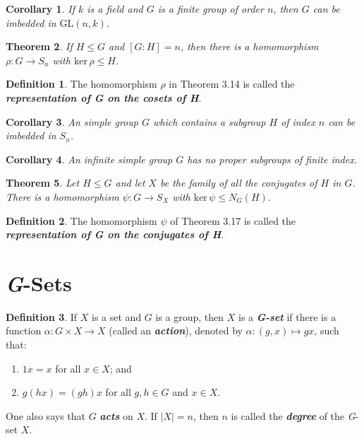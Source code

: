 \documentclass[12pt]{report}
\newtheorem{theorem}{Theorem}[chapter]
\newtheorem{corollary}[theorem]{Corollary}
\theoremstyle{definition}
\newtheorem*{definition}{Definition}
\newcommand{\term}[1]{\textbf{\textit{#1}}}
\begin{document}
\begin{corollary}
	If $k$ is a field and $G$ is a finite group of order $n$, then $G$ can be imbedded in $\mathrm{GL}(n,k)$.
\end{corollary}

\begin{theorem}
	If $H\leq G$ and $[G:H]=n$, then there is a homomorphism $\rho:G\to S_n$ with $\mathrm{ker}\,\rho\leq H$.
\end{theorem}

\begin{definition}
	The homomorphism $\rho$ in Theorem 3.14 is called the \term{representation of G on the cosets of H}.
\end{definition}

\begin{corollary}
	An simple group $G$ which contains a subgroup $H$ of index $n$ can be imbedded in $S_n$.
\end{corollary}

\begin{corollary}
	An infinite simple group $G$ has no proper subgroups of finite index.
\end{corollary}

\begin{theorem}
	Let $H\leq G$ and let $X$ be the family of all the conjugates of $H$ in $G$. There is a homomorphism $\psi:G\to S_X$ with $\mathrm{ker}\,\psi\leq N_G(H)$.
\end{theorem}

\begin{definition}
	The homomorphism $\psi$ of Theorem 3.17 is called the \term{representation of G on the conjugates of H}.
\end{definition}

\section{\textit{G}-Sets}
\begin{definition}
	If $X$ is a set and $G$ is a group, then $X$ is a \term{G-set} if there is a function $\alpha:G\times X\to X$ (called an \term{action}), denoted by $\alpha:(g,x)\mapsto gx$, such that:
	\begin{enumerate}
		\item $1x=x$ for all $x\in X$; and
		\item $g(hx) = (gh)x$ for all $g,h\in G$ and $x\in X$.
	\end{enumerate}
	One also says that $G$ \term{acts} on $X$. If $|X|=n$, then $n$ is called the \term{degree} of the \textit{G}-set $X$.
\end{definition}
\end{document}
